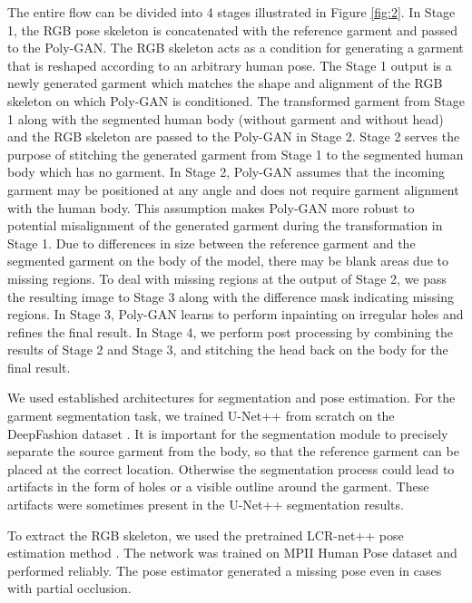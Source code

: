 \documentclass[11pt]{article}
\begin{document}
The entire flow can be divided into 4 stages illustrated in Figure \ref{fig:2}. 
In Stage 1, the RGB pose skeleton is concatenated with the reference garment and passed to the Poly-GAN. The RGB skeleton acts as a condition for generating a garment that is reshaped according to an arbitrary human pose. 
The Stage 1 output is a newly generated garment 
which matches the shape and alignment of the RGB skeleton on which Poly-GAN is conditioned. 
The transformed garment from Stage 1 along with the segmented human body
(without garment and without head) and the RGB skeleton are passed to the Poly-GAN in Stage 2. 
Stage 2 serves the purpose of stitching the generated garment from Stage 1 to the segmented human body which has no garment. In Stage 2, Poly-GAN assumes that the incoming garment may be positioned at any angle and does not require garment alignment with the human body. 
This assumption makes Poly-GAN more robust to potential misalignment of the generated garment during the transformation in Stage 1. 
Due to differences in size between the reference garment and the segmented garment on the body of the model, there may be blank areas due to missing regions.
To deal with missing regions at the output of Stage 2, we pass the resulting image to Stage 3 along with the difference mask indicating missing regions.
In Stage 3, Poly-GAN learns to perform inpainting on irregular holes and refines the final result. 
In Stage 4, we perform post processing
by combining the results of Stage 2 and Stage 3, and stitching the head back on the body for the final result. 





We used established architectures for segmentation and pose estimation. For the garment segmentation task, we trained U-Net++ \citet{Unet++} \citet{Unet} from scratch on the DeepFashion dataset \citet{DeepFashion}.
It is important for the segmentation module to precisely separate the source garment from the body, so that the reference garment can be placed at the correct location. 
Otherwise the segmentation process could lead to artifacts in the form of holes or a visible outline around the garment. These artifacts were sometimes present in the U-Net++ segmentation results.

To extract the RGB skeleton, we used the pretrained LCR-net++ pose estimation method \citet{LCR}.
The network was trained on MPII Human Pose dataset \citet{MPI2} and performed reliably. The pose estimator generated a missing pose even in cases with partial occlusion. 
\end{document}
